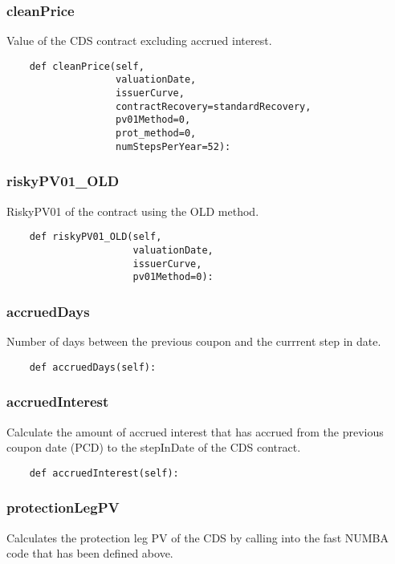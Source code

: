 \documentclass[twoside,11pt]{book}
\begin{document}
\subsubsection*{{\bf cleanPrice}}
Value of the CDS contract excluding accrued interest.  

\begin{lstlisting}
    def cleanPrice(self,
                   valuationDate,
                   issuerCurve,
                   contractRecovery=standardRecovery,
                   pv01Method=0,
                   prot_method=0,
                   numStepsPerYear=52):
\end{lstlisting}

\subsubsection*{{\bf riskyPV01\_OLD}}
RiskyPV01 of the contract using the OLD method.  

\begin{lstlisting}
    def riskyPV01_OLD(self,
                      valuationDate,
                      issuerCurve,
                      pv01Method=0):
\end{lstlisting}

\subsubsection*{{\bf accruedDays}}
Number of days between the previous coupon and the currrent step in date.  

\begin{lstlisting}
    def accruedDays(self):
\end{lstlisting}

\subsubsection*{{\bf accruedInterest}}
Calculate the amount of accrued interest that has accrued from the previous coupon date (PCD) to the stepInDate of the CDS contract.  

\begin{lstlisting}
    def accruedInterest(self):
\end{lstlisting}

\subsubsection*{{\bf protectionLegPV}}
Calculates the protection leg PV of the CDS by calling into the fast NUMBA code that has been defined above.  
\end{document}
